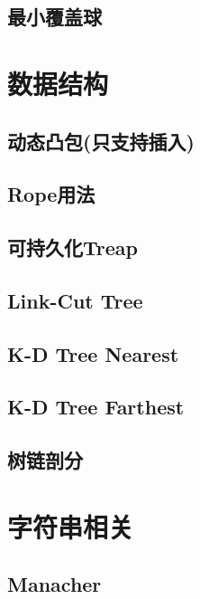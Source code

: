 \documentclass[10pt, a4paper]{article}
\begin{document}
	\subsection{最小覆盖球}
		

\section{数据结构}
	\subsection{动态凸包(只支持插入)}
		
		
	\subsection{Rope用法}
		
	
	\subsection{可持久化Treap}
		
	
	\subsection{Link-Cut Tree}
		

	\subsection{K-D Tree Nearest}
		

	\subsection{K-D Tree Farthest}
		

	\subsection{树链剖分}
		

\section{字符串相关}
	\subsection{Manacher}
		
\end{document}
